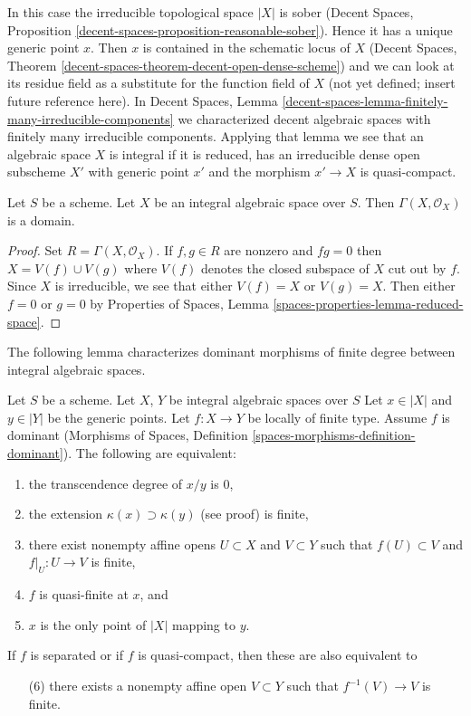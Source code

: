 \noindent
In this case the irreducible topological space $|X|$ is sober
(Decent Spaces, Proposition \ref{decent-spaces-proposition-reasonable-sober}).
Hence it has a unique generic point $x$.
Then $x$ is contained in the schematic locus of $X$
(Decent Spaces, Theorem \ref{decent-spaces-theorem-decent-open-dense-scheme})
and we can look at its residue field as a substitute for
the function field of $X$ (not yet defined; insert future reference here).
In Decent Spaces, Lemma
\ref{decent-spaces-lemma-finitely-many-irreducible-components}
we characterized decent algebraic spaces with finitely many
irreducible components. Applying that lemma we see that an
algebraic space $X$ is integral if it is
reduced, has an irreducible dense open subscheme $X'$
with generic point $x'$ and the morphism $x' \to X$ is quasi-compact.

\begin{lemma}
\label{lemma-integral-sections}
Let $S$ be a scheme. Let $X$ be an integral algebraic space over $S$.
Then $\Gamma(X, \mathcal{O}_X)$ is a domain.
\end{lemma}

\begin{proof}
Set $R = \Gamma(X, \mathcal{O}_X)$. If $f, g \in R$ are nonzero and
$fg = 0$ then $X = V(f) \cup V(g)$ where $V(f)$ denotes the closed subspace
of $X$ cut out by $f$. Since $X$ is irreducible, we see that either
$V(f) = X$ or $V(g) = X$. Then either $f = 0$ or $g = 0$ by
Properties of Spaces, Lemma \ref{spaces-properties-lemma-reduced-space}.
\end{proof}

\noindent
The following lemma characterizes dominant morphisms of finite degree
between integral algebraic spaces.

\begin{lemma}
\label{lemma-finite-degree}
Let $S$ be a scheme. Let $X$, $Y$ be integral algebraic spaces over $S$
Let $x \in |X|$ and $y \in |Y|$ be the generic points. Let $f : X \to Y$
be locally of finite type. Assume $f$ is dominant
(Morphisms of Spaces, Definition \ref{spaces-morphisms-definition-dominant}).
The following are equivalent:
\begin{enumerate}
\item the transcendence degree of $x/y$ is $0$,
\item the extension $\kappa(x) \supset \kappa(y)$ (see proof) is finite,
\item there exist nonempty affine opens $U \subset X$ and $V \subset Y$
such that $f(U) \subset V$ and $f|_U : U \to V$ is finite,
\item $f$ is quasi-finite at $x$, and
\item $x$ is the only point of $|X|$ mapping to $y$.
\end{enumerate}
If $f$ is separated or if $f$ is quasi-compact, then these are
also equivalent to
\begin{enumerate}
\item[(6)] there exists a nonempty affine open $V \subset Y$ such
that $f^{-1}(V) \to V$ is finite.
\end{enumerate}
\end{lemma}

